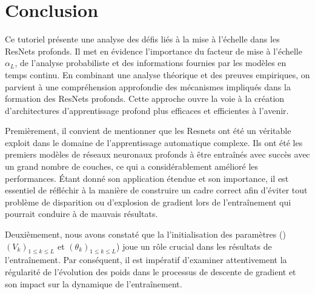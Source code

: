 \chapter{Conclusion}
Ce tutoriel présente une analyse des défis liés à la mise à l'échelle dans les ResNets profonds. Il met en évidence l'importance du facteur de mise à l'échelle \(\alpha_L\), de l'analyse probabiliste et des informations fournies par les modèles en temps continu. En combinant une analyse théorique et des preuves empiriques, on parvient à une compréhension approfondie des mécanismes impliqués dans la formation des ResNets profonds. Cette approche ouvre la voie à la création d'architectures d'apprentissage profond plus efficaces et efficientes à l'avenir.

Premièrement, il convient de mentionner que les Resnets ont été un véritable exploit dans le domaine de l'apprentissage automatique complexe. Ils ont été les premiers modèles de réseaux neuronaux profonds à être entraînés avec succès avec un grand nombre de couches, ce qui a considérablement amélioré les performances. Étant donné son application étendue et son importance, il est essentiel de réfléchir à la manière de construire un cadre correct afin d'éviter tout problème de disparition ou d'explosion de gradient lors de l'entraînement qui pourrait conduire à de mauvais résultats.

Deuxièmement, nous avons constaté que la l'initialisation des paramètres ()$(V_k)_{1\leqslant k \leqslant L }$ et $(\theta_k)_{1\leqslant k \leqslant L }$) joue un rôle crucial dans les résultats de l'entraînement. Par conséquent, il est impératif d'examiner attentivement la régularité de l'évolution des poids dans le processus de descente de gradient et son impact sur la dynamique de l'entraînement.